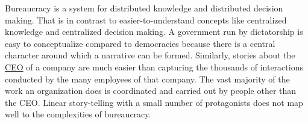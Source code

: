 Bureaucracy is a system for distributed knowledge and distributed decision making. 
That is in contrast to easier-to-understand concepts like centralized knowledge and centralized decision making. A government run by dictatorship is easy to conceptualize compared to democracies because there is a central character around which a narrative can be formed. Similarly, stories about the \href{https://en.wikipedia.org/wiki/Chief_executive_officer}{CEO} of a company are much easier than capturing the thousands of interactions conducted by the many employees of that company. The vast majority of the work an organization does is coordinated and carried out by people other than the CEO. Linear story-telling with a small number of protagonists does not map well to the complexities of bureaucracy. 


